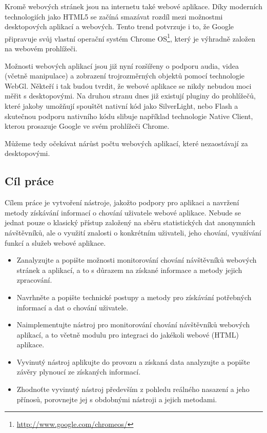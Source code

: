 \documentclass[bc,male,java,dept456]{diploma}						%
\begin{document}
Kromě webových stránek jsou na internetu také webové aplikace. Díky moderních technologiích jako HTML5 se začíná smazávat rozdíl mezi možnostmi desktopových aplikací a webových. Tento trend potvrzuje i to, že Google připravuje svůj vlastní operační systém Chrome OS\footnote{\url{http://www.google.com/chromeos/}}, který je výhradně založen na webovém prohlížeči.

Možnosti webových aplikací jsou již nyní rozšířeny o podporu audia, videa (včetně manipulace) a zobrazení trojrozměrných objektů pomocí technologie WebGl\cite{webgl}. Někteří i tak budou tvrdit, že webové aplikace se nikdy nebudou moci měřit s desktopovými. Na druhou stranu dnes již existují pluginy do prohlížečů, které jakoby umožňují spouštět nativní kód jako SilverLight, nebo Flash a skutečnou podporu nativního kódu slibuje například technologie Native Client, kterou prosazuje Google ve svém prohlížeči Chrome.

Můžeme tedy očekávat nárůst počtu webových aplikací, které nezaostávají za desktopovými. 


\subsection{Cíl práce}

Cílem práce je vytvoření nástroje, jakožto podpory pro aplikaci a navržení metody zí\-ská\-vá\-ní informací o chování uživatele webové aplikace. Nebude se jednat pouze o klasický přístup založený na sběru statistických dat anonymních návštěvníků, ale o využití znalosti o konkrétním uživateli, jeho chování, využívání funkcí a služeb webové aplikace.

\begin{itemize}
	\item Zanalyzujte a popište možnosti monitorování chování návštěvníků webových strá\-nek a aplikací, a to s důrazem na získané informace a metody jejich zpracování.
	\item Navrhněte a popište technické postupy a metody pro získávání potřebných informací a dat o chování uživatele.
	\item Naimplementujte nástroj pro monitorování chování návštěvníků webových aplikací, a to včetně modulu pro integraci do jakékoli webové (HTML) aplikace.
	\item Vyvinutý nástroj aplikujte do provozu a získaná data analyzujte a popište závěry plynoucí ze získaných informací.
	\item Zhodnoťte vyvinutý nástroj především z pohledu reálného nasazení a jeho přínosů, porovnejte jej s obdobnými nástroji a jejich metodami.
\end{itemize}
\end{document}
